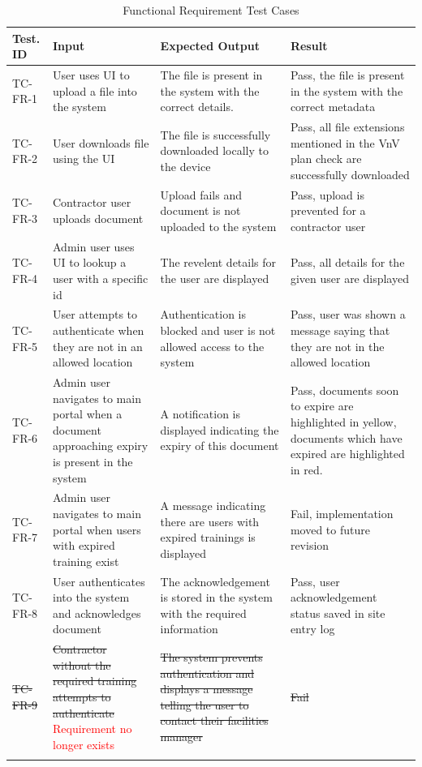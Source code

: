 \documentclass[12pt, titlepage]{article}
\begin{document}
\begin{longtable}{|m{1cm}|m{3cm}|m{5cm}|m{3cm}|}
  \hline
  \textbf{Test. ID} & \textbf{Input} & \textbf{Expected Output} &
  \textbf{Result} \\
  \hline
  TC-FR-1 & User uses UI to upload a file into the system & The file is
  present in the system with the correct details. & Pass, the file is
  present in the system with the correct metadata\\ \hline
  TC-FR-2 & User downloads file using the UI & The file is successfully
  downloaded locally to the device & Pass, all file extensions mentioned in the
  VnV plan check are successfully downloaded\\ \hline
  TC-FR-3 & Contractor user uploads document & Upload fails and document is not
  uploaded to the system & Pass, upload is prevented for a contractor
  user\\ \hline
  TC-FR-4 & Admin user uses UI to lookup a user with a specific id & The
  revelent details for the user are displayed & Pass, all details for
  the given user are displayed\\ \hline
  TC-FR-5 & User attempts to authenticate when they are not in an allowed
  location & Authentication is blocked and user is not allowed access to the
  system & Pass, user was shown a message saying that they are not in the
  allowed location\\ \hline
  TC-FR-6 & Admin user navigates to main portal when a document
  approaching expiry is present in the system & A notification is displayed
  indicating the expiry of this document &
  Pass, documents soon to expire are highlighted in yellow, documents
  which have expired are highlighted in red.\\ \hline
  TC-FR-7 & Admin user navigates to main portal when users with
  expired training exist & A message indicating there are users with
  expired trainings is displayed &
  Fail, implementation moved to future revision\\ \hline
  TC-FR-8 & User authenticates into the system and acknowledges
  document & The acknowledgement is stored in the system with the
  required information &
  Pass, user acknowledgement status saved in site entry log\\ \hline
  \sout{TC-FR-9} & \sout{Contractor without the required training attempts to
  authenticate} \textcolor{red}{Requirement no longer exists} &
  \sout{The system prevents authentication and displays a message
  telling the user to contact their facilities manager} &
  \sout{Fail}\\ \hline
  \caption{Functional Requirement Test Cases}
\end{longtable}
\end{document}
